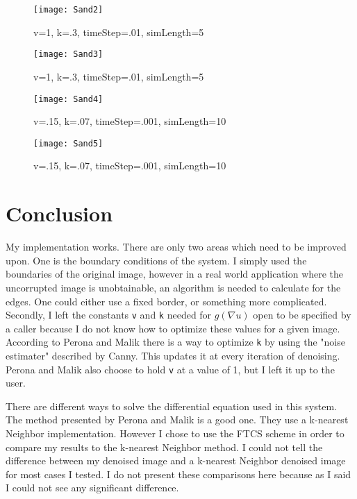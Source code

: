 \documentclass[12pt]{article}
\begin{document}
\begin{figure}[H]
  \centering
  \begin{minipage}[b]{0.49\textwidth}
    \texttt{[image: Sand2]}
    \caption{v=1, k=.3, timeStep=.01, simLength=5}
  \end{minipage}
  \hfill
  \begin{minipage}[b]{0.49\textwidth}
    \texttt{[image: Sand3]}
    \caption{v=1, k=.3, timeStep=.01, simLength=5}
  \end{minipage}
\end{figure}

\begin{figure}[H]
  \centering
  \begin{minipage}[b]{0.49\textwidth}
    \texttt{[image: Sand4]}
    \caption{v=.15, k=.07, timeStep=.001, simLength=10}
  \end{minipage}
  \hfill
  \begin{minipage}[b]{0.49\textwidth}
    \texttt{[image: Sand5]}
    \caption{v=.15, k=.07, timeStep=.001, simLength=10}
  \end{minipage}
\end{figure}



\section{Conclusion}\label{sec::conclusion}
My implementation works. There are only two areas which need to  be improved upon. One is the boundary conditions of the system. I simply used the boundaries of the original image, however in a real world application where the uncorrupted image is unobtainable, an algorithm is needed to calculate for the edges. One could either use a fixed border, or something more complicated.
Secondly, I left the constants \texttt{v} and \texttt{k} needed for $g(\nabla u)$ open to be specified by a caller because I do not know how to optimize these values for a given image. According to Perona and Malik \cite{PM} there is a way to optimize \texttt{k} by using the "noise estimater" described by Canny. This updates it at every iteration of denoising. Perona and Malik also choose to hold \texttt{v} at a value of 1, but I left it up to the user.

There are different ways to solve the differential equation used in this system. The method presented by Perona and Malik \cite{PM} is a good one. They use a k-nearest Neighbor implementation. However I chose to use the FTCS scheme in order to compare my results to the k-nearest Neighbor method. I could not tell the difference between my denoised image and a k-nearest Neighbor denoised image for most cases I tested. I do not present these comparisons here because as I said I could not see any significant difference.
\end{document}
